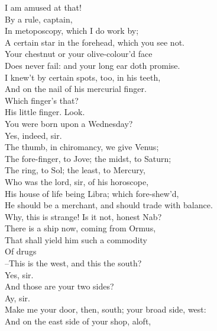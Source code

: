 \documentclass{memoir}
\begin{document}
\begin{drama*}
 I am amused at that!\\
\subtlespeaks {} By a rule, captain,\\
 In metoposcopy, which I do work by;\\
 A certain star in the forehead, which you see not.\\
 Your chestnut or your olive-colour'd face\\
 Does never fail: and your long ear doth promise.\\
 I knew't by certain spots, too, in his teeth,\\
 And on the nail of his mercurial finger.\\
\facespeaks  Which finger's that?\\
\subtlespeaks {} His little finger. Look.\\
 You were born upon a Wednesday?\\
\druggerspeaks {} Yes, indeed, sir.\\
\subtlespeaks  The thumb, in chiromancy, we give Venus;\\
 The fore-finger, to Jove; the midst, to Saturn;\\
 The ring, to Sol; the least, to Mercury,\\
 Who was the lord, sir, of his horoscope,\\
 His house of life being Libra; which fore-shew'd,\\
 He should be a merchant, and should trade with balance.\\
\facespeaks  Why, this is strange! Is it not, honest Nab?\\
\subtlespeaks  There is a ship now, coming from Ormus,\\
 That shall yield him such a commodity\\
 Of drugs\\
 --This is the west, and this the south?\\
\druggerspeaks {} Yes, sir.\\
\subtlespeaks  And those are your two sides?\\
\druggerspeaks {} Ay, sir.\\
\subtlespeaks {} Make me your door, then, south; your broad side, west:\\
 And on the east side of your shop, aloft,\\

\end{drama*}
\end{document}
